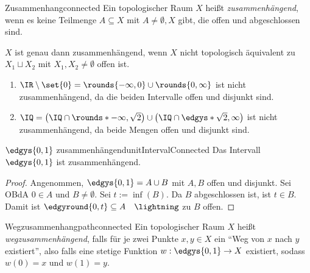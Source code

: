 \documentclass[language=ngerman]{TemplateLecture} %
\begin{document}
\begin{defi}{Zusammenhang}{connected}
    Ein topologischer Raum $X$ heißt \emph{zusammenhängend}, wenn es keine Teilmenge $A \subseteq X$ mit $A \neq \emptyset, X$ gibt, die offen und abgeschlossen sind.
\end{defi}
\begin{remark}
    $X$ ist genau dann  zusammenhängend, wenn $X$ nicht topologisch äquivalent zu $X_1 \sqcup X_2$ mit $X_1, X_2 \neq \emptyset$ offen ist.
\end{remark}
\begin{example}\leavevmode
    \begin{enumerate}[$(i)$]
        \item $\IR \setminus \set{0} = \rounds{-\infty,0} \cup \rounds{0,\infty}$ ist nicht zusammenhängend, da die beiden Intervalle offen und disjunkt sind.
        \item $\IQ = \left(\IQ \cap \rounds*{-\infty, \sqrt{2}}\right) \cup \left(\IQ \cap \edgys*{\sqrt{2}, \infty}\right)$ ist nicht zusammenhängend, da beide Mengen offen und disjunkt sind.
    \end{enumerate}
\end{example}

\begin{thm}{$\edgys{0,1}$ zusammenhängend}{unitIntervalConnected}
    Das Intervall $\edgys{0,1}$ ist zusammenhängend.
\end{thm}

\begin{proof}
    Angenommen, $\edgys{0,1} = A \cup B$ mit $A, B$ offen und disjunkt. Sei OBdA $0 \in A$ und $B \neq \emptyset$. Sei $t := \inf(B)$. Da $B$ abgeschlossen ist, ist $t \in B$. Damit ist $\edgyround{0,t} \subseteq A \quad \lightning$ zu $B$ offen.
\end{proof}

\begin{defi}{Wegzusammenhang}{pathconnected}
    Ein topologischer Raum $X$ heißt \emph{wegzusammenhängend}, falls für je zwei Punkte $x, y \in X$ ein \enquote{Weg von $x$ nach $y$ existiert}, also falls eine stetige Funktion $w: \edgys{0,1} \to X$ existiert, sodass $w(0) = x$ und $w(1) = y$.
\end{defi}
\end{document}
